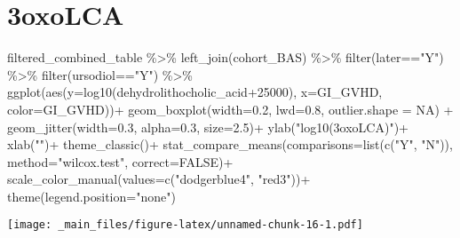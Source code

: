 \documentclass[
]{book}
\newenvironment{Shaded}{\begin{snugshade}}{\end{snugshade}}
\newcommand{\AttributeTok}[1]{\textcolor[rgb]{0.77,0.63,0.00}{#1}}
\newcommand{\ConstantTok}[1]{\textcolor[rgb]{0.00,0.00,0.00}{#1}}
\newcommand{\DecValTok}[1]{\textcolor[rgb]{0.00,0.00,0.81}{#1}}
\newcommand{\FloatTok}[1]{\textcolor[rgb]{0.00,0.00,0.81}{#1}}
\newcommand{\FunctionTok}[1]{\textcolor[rgb]{0.00,0.00,0.00}{#1}}
\newcommand{\NormalTok}[1]{#1}
\newcommand{\SpecialCharTok}[1]{\textcolor[rgb]{0.00,0.00,0.00}{#1}}
\newcommand{\StringTok}[1]{\textcolor[rgb]{0.31,0.60,0.02}{#1}}
\begin{document}
\hypertarget{oxolca}{%
\section{3oxoLCA}\label{oxolca}}

\begin{Shaded}
\begin{Highlighting}[]
\NormalTok{filtered\_combined\_table }\SpecialCharTok{\%\textgreater{}\%} 
  \FunctionTok{left\_join}\NormalTok{(cohort\_BAS) }\SpecialCharTok{\%\textgreater{}\%} 
  \FunctionTok{filter}\NormalTok{(later}\SpecialCharTok{==}\StringTok{"Y"}\NormalTok{) }\SpecialCharTok{\%\textgreater{}\%} 
  \FunctionTok{filter}\NormalTok{(ursodiol}\SpecialCharTok{==}\StringTok{"Y"}\NormalTok{) }\SpecialCharTok{\%\textgreater{}\%} 
  \FunctionTok{ggplot}\NormalTok{(}\FunctionTok{aes}\NormalTok{(}\AttributeTok{y=}\FunctionTok{log10}\NormalTok{(dehydrolithocholic\_acid}\SpecialCharTok{+}\DecValTok{25000}\NormalTok{), }\AttributeTok{x=}\NormalTok{GI\_GVHD, }\AttributeTok{color=}\NormalTok{GI\_GVHD))}\SpecialCharTok{+}
  \FunctionTok{geom\_boxplot}\NormalTok{(}\AttributeTok{width=}\FloatTok{0.2}\NormalTok{, }\AttributeTok{lwd=}\FloatTok{0.8}\NormalTok{, }\AttributeTok{outlier.shape =} \ConstantTok{NA}\NormalTok{) }\SpecialCharTok{+}
  \FunctionTok{geom\_jitter}\NormalTok{(}\AttributeTok{width=}\FloatTok{0.3}\NormalTok{, }\AttributeTok{alpha=}\FloatTok{0.3}\NormalTok{, }\AttributeTok{size=}\FloatTok{2.5}\NormalTok{)}\SpecialCharTok{+}
  \FunctionTok{ylab}\NormalTok{(}\StringTok{"log10(3oxoLCA)"}\NormalTok{)}\SpecialCharTok{+}
  \FunctionTok{xlab}\NormalTok{(}\StringTok{""}\NormalTok{)}\SpecialCharTok{+}
  \FunctionTok{theme\_classic}\NormalTok{()}\SpecialCharTok{+}
  \FunctionTok{stat\_compare\_means}\NormalTok{(}\AttributeTok{comparisons=}\FunctionTok{list}\NormalTok{(}\FunctionTok{c}\NormalTok{(}\StringTok{"Y"}\NormalTok{, }\StringTok{"N"}\NormalTok{)),}
                     \AttributeTok{method=}\StringTok{"wilcox.test"}\NormalTok{,}
                     \AttributeTok{correct=}\ConstantTok{FALSE}\NormalTok{)}\SpecialCharTok{+}
  \FunctionTok{scale\_color\_manual}\NormalTok{(}\AttributeTok{values=}\FunctionTok{c}\NormalTok{(}\StringTok{"dodgerblue4"}\NormalTok{, }\StringTok{"red3"}\NormalTok{))}\SpecialCharTok{+}
  \FunctionTok{theme}\NormalTok{(}\AttributeTok{legend.position=}\StringTok{"none"}\NormalTok{)}
\end{Highlighting}
\end{Shaded}

\texttt{[image: \_main\_files/figure-latex/unnamed-chunk-16-1.pdf]}
\end{document}
